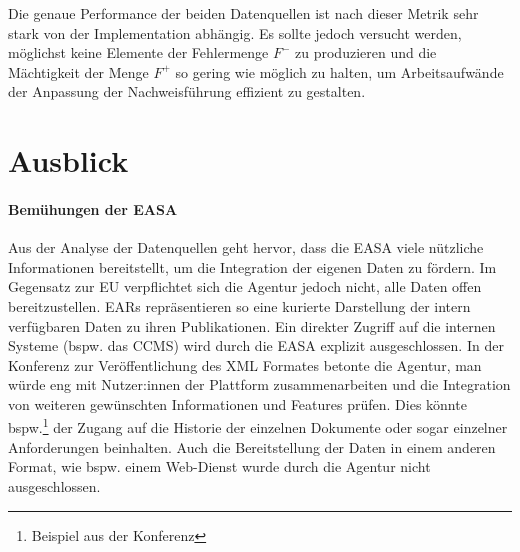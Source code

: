     
    \medskip
    Die genaue Performance der beiden Datenquellen ist nach dieser Metrik sehr stark von der Implementation abhängig. 
    Es sollte jedoch versucht werden, möglichst keine Elemente der Fehlermenge $F^-$ zu produzieren und die Mächtigkeit der Menge $F^+$ so gering wie möglich zu halten, um Arbeitsaufwände der Anpassung der Nachweisführung effizient zu gestalten.
    

\chapter{Ausblick}\label{ch:ausblick}
\subsubsection{Bemühungen der EASA}

    Aus der Analyse der Datenquellen geht hervor, dass die \ac{EASA} viele nützliche Informationen bereitstellt, um die Integration der eigenen Daten zu fördern.
    Im Gegensatz zur \ac{EU} verpflichtet sich die Agentur jedoch nicht, alle Daten offen bereitzustellen.
    \acp{EAR} repräsentieren so eine kurierte Darstellung der intern verfügbaren Daten zu ihren Publikationen.
    Ein direkter Zugriff auf die internen Systeme (bspw. das \ac{CCMS}) wird durch die \ac{EASA} explizit ausgeschlossen.
    In der Konferenz zur Veröffentlichung des \ac{XML} Formates \cite{easa_xml_publication} betonte die Agentur, man würde eng mit Nutzer:innen der Plattform zusammenarbeiten und die Integration von weiteren gewünschten Informationen und Features prüfen.
    Dies könnte bspw.\footnote{Beispiel aus der Konferenz} der Zugang auf die Historie der einzelnen Dokumente oder sogar einzelner Anforderungen beinhalten.
    Auch die Bereitstellung der Daten in einem anderen Format, wie bspw. einem Web-Dienst wurde durch die Agentur nicht ausgeschlossen.

